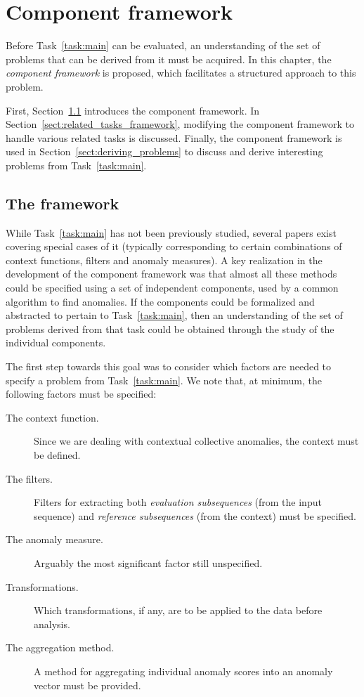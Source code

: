 \chapter{Component framework}
\label{ch:methods}

Before Task~\ref{task:main} can be evaluated, an understanding of the set of problems that can be derived from it must be acquired. In this chapter, the \emph{component framework} is proposed, which facilitates a structured approach to this problem.

First, Section~\ref{sect:framework} introduces the component framework. In Section~\ref{sect:related_tasks_framework}, modifying the component framework to handle various related tasks is discussed. Finally, the component framework is used in Section~\ref{sect:deriving_problems} to discuss and derive interesting problems from Task~\ref{task:main}.

\section{The framework}
\label{sect:framework}

While Task~\ref{task:main} has not been previously studied, several papers exist covering special cases of it (typically corresponding to certain combinations of context functions, filters and anomaly measures). A key realization in the development of the component framework was that almost all these methods could be specified using a set of independent components, used by a common algorithm to find anomalies. If the components could be formalized and abstracted to pertain to Task~\ref{task:main}, then an understanding of the set of problems derived from that task could be obtained through the study of the individual components.

The first step towards this goal was to consider which factors are needed to specify a problem from Task~\ref{task:main}. We note that, at minimum, the following factors must be specified:

\begin{description}
  \item[The context function.] Since we are dealing with contextual collective anomalies, the context must be defined.
  \item[The filters.] Filters for extracting both \emph{evaluation subsequences} (from the input sequence) and \emph{reference subsequences} (from the context) must be specified.
  \item[The anomaly measure.] Arguably the most significant factor still unspecified.
  \item[Transformations.] Which transformations, if any, are to be applied to the data before analysis.
  \item[The aggregation method.] A method for aggregating individual anomaly scores into an anomaly vector must be provided.
\end{description}

